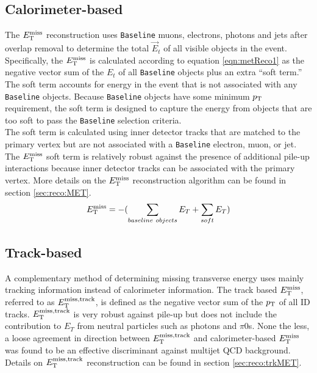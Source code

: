 \subsection{\boldmath Calorimeter-based \met}

\indent The $E_{\mathrm{T}}^{\mathrm{miss}}$ reconstruction uses {\tt Baseline} muons, electrons, photons and jets after overlap removal to determine the total $\vec{E}_t$ of all visible objects in the event.   Specifically, the $E_{\mathrm{T}}^{\mathrm{miss}}$ is calculated according to equation \ref{eqn:metReco1} as the negative vector sum of the $E_t$ of all {\tt Baseline} objects plus an extra ``soft term.''  The soft term accounts for energy in the event that is not associated with any {\tt Baseline} objects.  Because {\tt Baseline} objects have some minimum $p_{\mathrm{T}}$ requirement, the soft term is designed to capture the energy from objects that are too soft to pass the {\tt Baseline} selection criteria. \\

\indent The soft term is calculated using inner detector tracks that are matched to the primary vertex but are not associated with a {\tt Baseline} electron, muon, or jet.   The $E_{\mathrm{T}}^{\mathrm{miss}}$ soft term is relatively robust against the presence of additional pile-up interactions because inner detector tracks can be associated with the primary vertex.  More details on the $E_{\mathrm{T}}^{\mathrm{miss}}$ reconstruction algorithm can be found in section \ref{sec:reco:MET}. \\ 

\begin{equation}
E_{\mathrm{T}}^{\mathrm{miss}} = - ( \sum_{baseline~objects} E_T + \sum_{soft} E_T ) 
\label{eqn:metReco1}
\end{equation}

\subsection{\boldmath Track-based \MET}

\indent A complementary method of determining missing transverse energy uses mainly tracking information instead of calorimeter information.  The track based $E_{\mathrm{T}}^{\mathrm{miss}}$, referred to as $E_{\mathrm{T}}^{\mathrm{miss, track}}$, is defined as the negative vector sum of the $p_{\mathrm{T}}$ of all ID tracks.  $E_{\mathrm{T}}^{\mathrm{miss, track}}$ is very robust against pile-up but does not include the contribution to $E_T$ from neutral particles such as photons and $\pi0$s.  None the less, a loose agreement in direction between $E_{\mathrm{T}}^{\mathrm{miss, track}}$ and calorimeter-based $E_{\mathrm{T}}^{\mathrm{miss}}$ was found to be an effective discriminant against multijet QCD background.  Details on $E_{\mathrm{T}}^{\mathrm{miss, track}}$ reconstruction can be found in section \ref{sec:reco:trkMET}. \\

